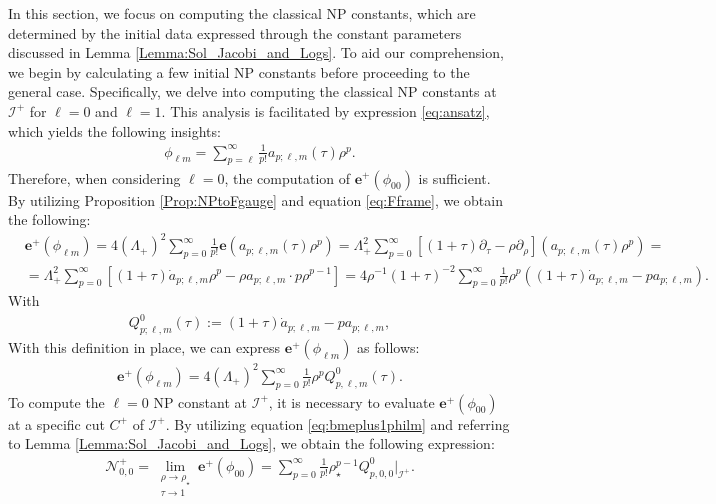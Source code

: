 In this section, we focus on computing the classical NP constants, which are determined by the initial data expressed through the constant parameters discussed in Lemma \ref{Lemma:Sol_Jacobi_and_Logs}. To aid our comprehension, we begin by calculating a few initial NP constants before proceeding to the general case. Specifically, we delve into computing the classical NP constants at $\mathscr{I}^{+}$ for $\ell=0$ and $\ell=1$. This analysis is facilitated by expression \eqref{eq:ansatz}, which yields the following insights:
\begin{align}\label{eq:exp_phi_lm}
  \phi_{\ell m}= \sum_{p=\ell}^{\infty}\frac{1}{p!}a_{p;\ell,m}(\tau)\rho^{p}.
\end{align}
Therefore, when considering $\ell=0$, the computation of $\boldsymbol{e}^{+}(\phi_{00})$ is sufficient. By utilizing Proposition \ref{Prop:NPtoFgauge} and equation \eqref{eq:Fframe}, we obtain the following:
\begin{align}\label{eq:bmeplus1philmraw}
   & \boldsymbol{e}^{+}(\phi_{\ell m})= 4(\Lambda_{+})^{2}\sum_{p=0}^{\infty}\frac{1}{p!}\boldsymbol{e}(a_{p;\ell,m}(\tau)\rho^{p}) = \Lambda_{+}^{2} \sum_{p=0}^{\infty} \left[(1+\tau) \partial_{\tau}-\rho \partial_{\rho}\right]\left(a_{p ; \ell, m}(\tau) \rho^{p}\right)= \nonumber \\
   & =\Lambda_{+}^{2} \sum_{p=0}^{\infty} \left[(1+\tau) \dot{a}_{p; \ell, m} \rho^{p}-\rho a_{p ; \ell, m} \cdot p \rho^{p-1}\right] = 4 \rho^{-1}(1+\tau)^{-2}\sum_{p=0}^{\infty} \frac{1}{p!}\rho^p((1+\tau)\dot{a}_{p;\ell,m}-p a_{p;\ell,m}).
\end{align}
With
\begin{align}\label{eq:defQ0}
  Q^{0}_{p;\ell,m}(\tau):=(1+\tau)\dot{a}_{p;\ell,m}-p a_{p;\ell,m},
\end{align}
With this definition in place, we can express $\boldsymbol{e}^{+}(\phi_{\ell m})$ as follows:
\begin{align}\label{eq:bmeplus1philm}
  \boldsymbol{e}^{+}(\phi_{\ell m}) = 4 (\Lambda_{+})^{2}\sum_{p=0}^{\infty} \frac{1}{p!}\rho^{p}Q^{0}_{p,\ell,m}(\tau).
\end{align}
To compute the $\ell=0$ NP constant at $\mathscr{I}^{+}$, it is necessary to evaluate $\boldsymbol{e}^{+}(\phi_{00})$ at a specific cut ${C}^{+}$ of $\mathscr{I}^{+}$. By utilizing equation \eqref{eq:bmeplus1philm} and referring to Lemma \ref{Lemma:Sol_Jacobi_and_Logs}, we obtain the following expression:
\begin{align}
  \mathcal{N}^{+}_{0,0}= \lim_{\substack{\rho \to \rho_{\star} \\ \tau \to 1}}  \boldsymbol{e}^{+}(\phi_{00}) = \sum_{p=0}^{\infty} \frac{1}{p!}\rho^{p-1}_{\star}Q^{0}_{p,0,0}|_{\mathscr{I}^{+}}.
\end{align}
